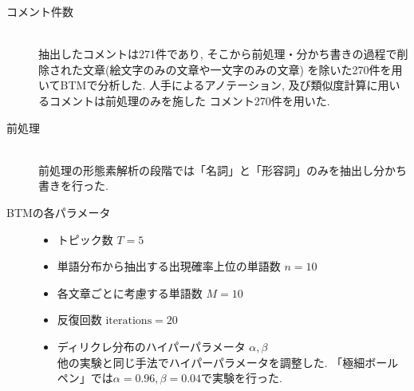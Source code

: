 \documentclass{ltjarticle}
\begin{document}
\begin{description}
    \item[コメント件数]\mbox{}\\
    抽出したコメントは271件であり, そこから前処理・分かち書きの過程で削除された文章(絵文字のみの文章や一文字のみの文章)
    を除いた270件を用いてBTMで分析した. 人手によるアノテーション, 及び類似度計算に用いるコメントは前処理のみを施した
    コメント270件を用いた. 

    \item[前処理] \mbox{}\\
    前処理の形態素解析の段階では「名詞」と「形容詞」のみを抽出し分かち書きを行った. 
    \item[BTMの各パラメータ]\mbox{}
    \begin{itemize}
        \item トピック数 $T=5$
        \item 単語分布から抽出する出現確率上位の単語数 $n = 10$
        \item 各文章ごとに考慮する単語数 $M=10$
        \item 反復回数 $\textrm{iterations} = 20$
        \item ディリクレ分布のハイパーパラメータ $\alpha, \beta$\\
        他の実験と同じ手法でハイパーパラメータを調整した. 
        「極細ボールペン」では$\alpha = 0.96, \beta = 0.04$で実験を行った. 
    \end{itemize}
\end{description}
\vspace{10truept}
\end{document}
